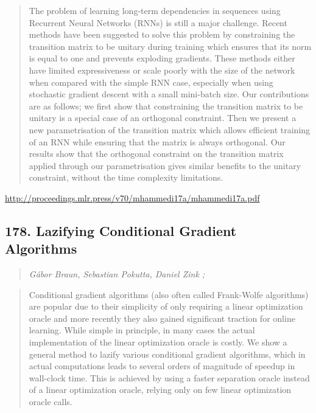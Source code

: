 \documentclass{article}
\begin{document}
\begin{quote}
    The problem of learning long-term dependencies in sequences using Recurrent Neural Networks (RNNs) is still a major challenge. Recent methods have been suggested to solve this problem by constraining the transition matrix to be unitary during training which ensures that its norm is equal to one and prevents exploding gradients. These methods either have limited expressiveness or scale poorly with the size of the network when compared with the simple RNN case, especially when using stochastic gradient descent with a small mini-batch size. Our contributions are as follows; we first show that constraining the transition matrix to be unitary is a special case of an orthogonal constraint. Then we present a new parametrisation of the transition matrix which allows efficient training of an RNN while ensuring that the matrix is always orthogonal. Our results show that the orthogonal constraint on the transition matrix applied through our parametrisation gives similar benefits to the unitary constraint, without the time complexity limitations.  
\end{quote}

\href{http://proceedings.mlr.press/v70/mhammedi17a/mhammedi17a.pdf}{http://proceedings.mlr.press/v70/mhammedi17a/mhammedi17a.pdf}

\subsection{178. Lazifying Conditional Gradient Algorithms}

\begin{quote}
\footnotesize{\textit{Gábor Braun, Sebastian Pokutta, Daniel Zink ;}}

\end{quote}

\begin{quote}
    Conditional gradient algorithms (also often called Frank-Wolfe algorithms) are popular due to their simplicity of only requiring a linear optimization oracle and more recently they also gained significant traction for online learning. While simple in principle, in many cases the actual implementation of the linear optimization oracle is costly. We show a general method to lazify various conditional gradient algorithms, which in actual computations leads to several orders of magnitude of speedup in wall-clock time. This is achieved by using a faster separation oracle instead of a linear optimization oracle, relying only on few linear optimization oracle calls.  
\end{quote}
\end{document}
